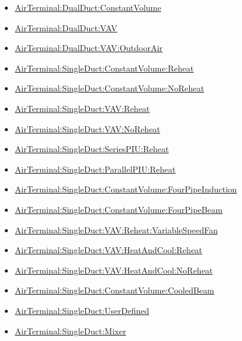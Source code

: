 \begin{itemize}
\item
  \hyperref[airterminaldualductconstantvolume]{AirTerminal:DualDuct:ConstantVolume}
\item
  \hyperref[airterminaldualductvav]{AirTerminal:DualDuct:VAV}
\item
  \hyperref[airterminaldualductvavoutdoorair]{AirTerminal:DualDuct:VAV:OutdoorAir}
\item
  \hyperref[airterminalsingleductconstantvolumereheat]{AirTerminal:SingleDuct:ConstantVolume:Reheat}
\item
  \hyperref[airterminalsingleductconstantvolumenoreheat]{AirTerminal:SingleDuct:ConstantVolume:NoReheat}
\item
  \hyperref[airterminalsingleductvavreheat]{AirTerminal:SingleDuct:VAV:Reheat}
\item
  \hyperref[airterminalsingleductvavnoreheat]{AirTerminal:SingleDuct:VAV:NoReheat}
\item
  \hyperref[airterminalsingleductseriespiureheat]{AirTerminal:SingleDuct:SeriesPIU:Reheat}
\item
  \hyperref[airterminalsingleductparallelpiureheat]{AirTerminal:SingleDuct:ParallelPIU:Reheat}
\item
  \hyperref[airterminalsingleductconstantvolumefourpipeinduction]{AirTerminal:SingleDuct:ConstantVolume:FourPipeInduction}
\item
  \hyperref[airterminalsingleductconstantvolumefourpipebeam]{AirTerminal:SingleDuct:ConstantVolume:FourPipeBeam}
\item
  \hyperref[airterminalsingleductvavreheatvariablespeedfan]{AirTerminal:SingleDuct:VAV:Reheat:VariableSpeedFan}
\item
  \hyperref[airterminalsingleductvavheatandcoolreheat]{AirTerminal:SingleDuct:VAV:HeatAndCool:Reheat}
\item
  \hyperref[airterminalsingleductvavheatandcoolnoreheat]{AirTerminal:SingleDuct:VAV:HeatAndCool:NoReheat}
\item
  \hyperref[airterminalsingleductconstantvolumecooledbeam]{AirTerminal:SingleDuct:ConstantVolume:CooledBeam}
\item
  \hyperref[airterminalsingleductuserdefined]{AirTerminal:SingleDuct:UserDefined}
\item
  \hyperref[airterminalsingleductmixer]{AirTerminal:SingleDuct:Mixer}

\end{itemize}

